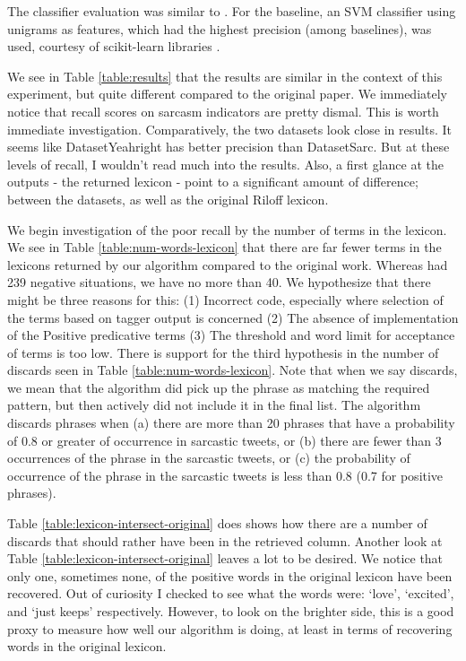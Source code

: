 \documentclass[11pt]{article}
\begin{document}
The classifier evaluation was similar to \cite{riloff2013sarcasm}. For the baseline, an SVM classifier using unigrams as features, which had the highest precision (among baselines), was used, courtesy of scikit-learn libraries \cite{scikit-learn}.

We see in Table \ref{table:results} that the results are similar in the context of this experiment, but quite different compared to the original paper. We immediately notice that recall scores on sarcasm indicators are pretty dismal. This is worth immediate investigation. Comparatively, the two datasets look close in results. It seems like DatasetYeahright has better precision than DatasetSarc. But at these levels of recall, I wouldn't read much into the results. Also, a first glance at the outputs - the returned lexicon - point to a significant amount of difference; between the datasets, as well as the original Riloff lexicon.

We begin investigation of the poor recall by the number of terms in the lexicon. We see in Table \ref{table:num-words-lexicon} that there are far fewer terms in the lexicons returned by our algorithm compared to the original work. Whereas \cite{riloff2013sarcasm} had 239 negative situations, we have no more than 40. We hypothesize that there might be three reasons for this: (1) Incorrect code, especially where selection of the terms based on tagger output is concerned (2) The absence of implementation of the Positive predicative terms (3) The threshold and word limit for acceptance of terms is too low. There is support for the third hypothesis in the number of discards seen in Table \ref{table:num-words-lexicon}. Note that when we say discards, we mean that the algorithm did pick up the phrase as matching the required pattern, but then actively did not include it in the final list. The algorithm discards phrases when (a) there are more than 20 phrases that have a probability of 0.8 or greater of occurrence in sarcastic tweets, or (b) there are fewer than 3 occurrences of the phrase in the sarcastic tweets, or (c) the probability of occurrence of the phrase in the sarcastic tweets is less than 0.8 (0.7 for positive phrases).

Table \ref{table:lexicon-intersect-original} does shows how there are a number of discards that should rather have been in the retrieved column. Another look at Table \ref{table:lexicon-intersect-original} leaves a lot to be desired. We notice that only one, sometimes none, of the positive words in the original lexicon have been recovered. Out of curiosity I checked to see what the words were: `love', `excited', and `just keeps' respectively. However, to look on the brighter side, this is a good proxy to measure how well our algorithm is doing, at least in terms of recovering words in the original lexicon. 
\end{document}
